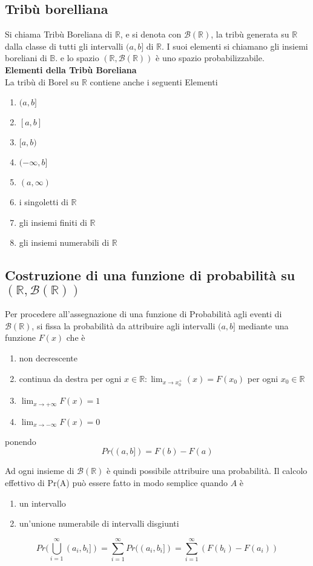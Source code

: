 \documentclass[12pt]{report}
\begin{document}
  \subsection{Tribù borelliana}
  Si chiama Tribù Boreliana di $\mathbb{R}$, e si denota con $\mathcal{B}(\mathbb{R})$, la tribù generata su $\mathbb{R}$ dalla classe di tutti gli intervalli $(a,b]$ di $\mathbb{R}$. I suoi elementi si chiamano gli insiemi boreliani di $\mathbb{B}$. e lo spazio $(\mathbb{R},\mathcal{B}(\mathbb{R}))$ è uno spazio probabilizzabile.\\
  \textbf{Elementi della Tribù Boreliana}\\
  La tribù di Borel su $\mathbb{R}$ contiene anche i seguenti Elementi
  \begin{enumerate}
    \item $(a,b]$
    \item $[a,b]$
    \item $[a,b)$
    \item $(-\infty, b]$
    \item $(a, \infty)$
    \item i singoletti di $\mathbb{R}$
    \item gli insiemi finiti di $\mathbb{R}$
    \item gli insiemi numerabili di $\mathbb{R}$
  \end{enumerate}

  \subsection{Costruzione di una funzione di probabilità su $(\mathbb{R},\mathcal{B}(\mathbb{R}))$}
  Per procedere all'assegnazione di una funzione di Probabilità agli eventi di $\mathcal{B}(\mathbb{R})$, si fissa la probabilità da attribuire agli intervalli $(a,b]$ mediante una funzione $F(x)$ che è
  \begin{enumerate}
    \item non decrescente
    \item continua da destra per ogni $x \in \mathbb{R}: \lim_{x\to x_0^+}(x) = F(x_0)$ per ogni $x_0 \in \mathbb{R}$
    \item $\lim_{x\to +\infty} F(x) = 1$
    \item $\lim_{x\to -\infty} F(x) = 0$
  \end{enumerate}
  ponendo
  \[ Pr((a,b]) = F(b) - F(a) \]

  Ad ogni insieme di $\mathcal{B}(\mathbb{R})$ è quindi possibile attribuire una probabilità. Il calcolo effettivo di Pr(A) può essere fatto in modo semplice quando $A$ è
  \begin{enumerate}
    \item un intervallo
    \item un'unione numerabile di intervalli disgiunti
  \end{enumerate}
  \[ Pr(\bigcup\limits_{i=1}^{\infty} (a_i,b_i]) = \sum_{i=1}^{\infty} Pr((a_i,b_i]) = \sum_{i=1}^{\infty} (F(b_i)-F(a_i)) \]
\end{document}
